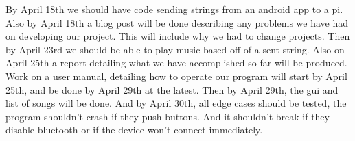 \documentclass[letter]{article}
\begin{document}
By April 18th we should have code sending strings from an android app to a pi. Also by April 18th a blog post will be done describing any problems we have had on developing our project. This will include why we had to change projects. Then by April 23rd we should be able to play music based off of a sent string. Also on April 25th a report detailing what we have accomplished so far will be produced. Work on a user manual, detailing how to operate our program will start by April 25th, and be done by April 29th at the latest. Then by April 29th, the gui and list of songs will be done. And by April 30th, all edge cases should be tested, the program shouldn't crash if they push buttons. And it shouldn't break if they disable bluetooth or if the device won't connect immediately.
\end{document}
